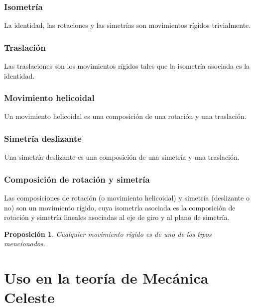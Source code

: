 \documentclass[11pt]{article}
\newtheorem{prop}{Proposición}[section]
\theoremstyle{definition}
\begin{document}
  \subsubsection{Isometría}
  La identidad, las rotaciones y las simetrías son movimientos rígidos trivialmente.
  \subsubsection{Traslación}
  Las traslaciones son los movimientos rígidos tales que la isometría asociada es la identidad.
  \subsubsection{Movimiento helicoidal}
  Un movimiento helicoidal es una composición de una rotación y una traslación.
  \subsubsection{Simetría deslizante}
  Una simetría deslizante es una composición de una simetría y una traslación.
  \subsubsection{Composición de rotación y simetría}
  Las composiciones de rotación (o movimiento helicoidal) y simetría (deslizante o no) son un movimiento rígido,
  cuya isometría asociada es la composición de rotación y simetría lineales asociadas al eje de giro y al plano de simetría.

  \begin{prop}
  Cualquier movimiento rígido es de uno de los tipos mencionados.
  \end{prop}


\section{Uso en la teoría de Mecánica Celeste}
\end{document}
